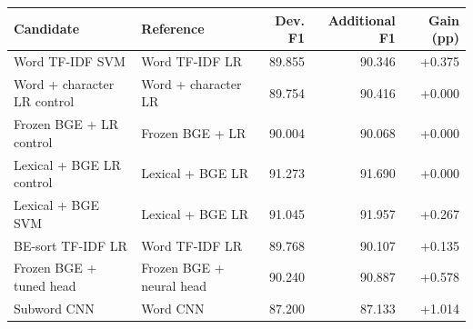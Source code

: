 \begin{tabular}{p{40mm}p{40mm}rrr}
\toprule
Candidate & Reference & Dev. F1 & Additional F1 & Gain (pp) \\
\midrule
Word TF-IDF SVM & Word TF-IDF LR & 89.855 & 90.346 & +0.375 \\
Word + character LR control & Word + character LR & 89.754 & 90.416 & +0.000 \\
Frozen BGE + LR control & Frozen BGE + LR & 90.004 & 90.068 & +0.000 \\
Lexical + BGE LR control & Lexical + BGE LR & 91.273 & 91.690 & +0.000 \\
Lexical + BGE SVM & Lexical + BGE LR & 91.045 & 91.957 & +0.267 \\
BE-sort TF-IDF LR & Word TF-IDF LR & 89.768 & 90.107 & +0.135 \\
Frozen BGE + tuned head & Frozen BGE + neural head & 90.240 & 90.887 & +0.578 \\
Subword CNN & Word CNN & 87.200 & 87.133 & +1.014 \\
\bottomrule
\end{tabular}

